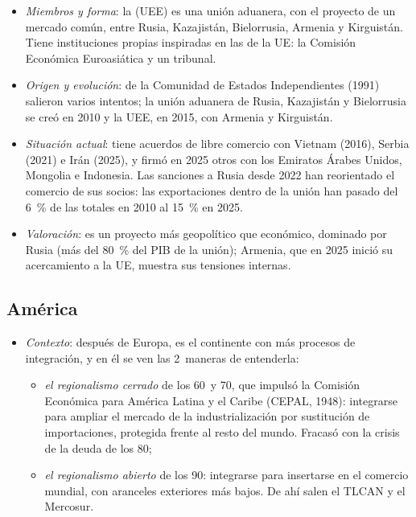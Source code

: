 \documentclass[11pt]{article}
\begin{document}
\begin{itemize}
\item \emph{Miembros y forma}: la  (UEE) es una unión aduanera, con el proyecto de un mercado común, entre Rusia, Kazajistán, Bielorrusia, Armenia y Kirguistán. Tiene instituciones propias inspiradas en las de la UE: la Comisión Económica Euroasiática y un tribunal.
\item \emph{Origen y evolución}: de la Comunidad de Estados Independientes (1991) salieron varios intentos; la unión aduanera de Rusia, Kazajistán y Bielorrusia se creó en 2010 y la UEE, en 2015, con Armenia y Kirguistán.
\item \emph{Situación actual}: tiene acuerdos de libre comercio con Vietnam (2016), Serbia (2021) e Irán (2025), y firmó en 2025 otros con los Emiratos Árabes Unidos, Mongolia e Indonesia\nocite{TASS2026UEE}. Las sanciones a Rusia desde 2022 han reorientado el comercio de sus socios: las exportaciones dentro de la unión han pasado del 6~\% de las totales en 2010 al 15~\% en 2025\nocite{FMI2026IMTS}.
\item \emph{Valoración}: es un proyecto más geopolítico que económico, dominado por Rusia (más del 80~\% del PIB de la unión); Armenia, que en 2025 inició su acercamiento a la UE, muestra sus tensiones internas.
\end{itemize}

\subsection{América}\label{sec:america}

\begin{itemize}
\item \emph{Contexto}: después de Europa, es el continente con más procesos de integración, y en él se ven las 2~maneras de entenderla:
  \begin{itemize}
  \item \emph{el regionalismo cerrado} de los 60~y 70, que impulsó la Comisión Económica para América Latina y el Caribe (CEPAL, 1948): integrarse para ampliar el mercado de la industrialización por sustitución de importaciones, protegida frente al resto del mundo. Fracasó con la crisis de la deuda de los 80;
  \item \emph{el regionalismo abierto} de los 90: integrarse para insertarse en el comercio mundial, con aranceles exteriores más bajos. De ahí salen el TLCAN y el Mercosur.
  \end{itemize}
\end{itemize}
\end{document}
